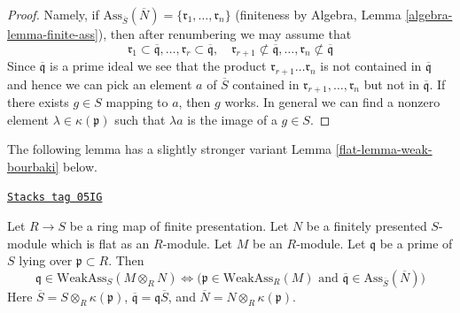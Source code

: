 \begin{proof}
Namely, if $\text{Ass}_{\overline{S}}(\overline{N}) =
\{\mathfrak r_1, \ldots, \mathfrak r_n\}$
(finiteness by Algebra, Lemma \ref{algebra-lemma-finite-ass}),
then after renumbering we may assume that
$$
\mathfrak r_1 \subset \overline{\mathfrak q},
\ldots,
\mathfrak r_r \subset \overline{\mathfrak q}, \quad
\mathfrak r_{r + 1} \not \subset \overline{\mathfrak q},
\ldots,
\mathfrak r_n \not \subset \overline{\mathfrak q}
$$
Since $\overline{\mathfrak q}$ is a prime ideal we see that the product
$\mathfrak r_{r + 1} \ldots \mathfrak r_n$ is not contained in
$\overline{\mathfrak q}$ and hence we can pick an element
$a$ of $\overline{S}$ contained in
$\mathfrak r_{r + 1}, \ldots, \mathfrak r_n$ but not in
$\overline{\mathfrak q}$.
If there exists $g \in S$ mapping to $a$, then $g$
works. In general we can find a nonzero element
$\lambda \in \kappa(\mathfrak p)$
such that $\lambda a$ is the image of a $g \in S$.
\end{proof}

The following lemma has a slightly stronger variant
Lemma \ref{flat-lemma-weak-bourbaki}
below.

\begin{lemma}
\label{flat-lemma-weak-bourbaki-pre}
\href{https://stacks.math.columbia.edu/tag/05IG}{\texttt{Stacks tag 05IG}}

Let $R \to S$ be a ring map of finite presentation.
Let $N$ be a finitely presented $S$-module
which is flat as an $R$-module. Let $M$ be an $R$-module.
Let $\mathfrak q$ be a prime of $S$ lying over $\mathfrak p \subset R$.
Then
$$
\mathfrak q \in \text{WeakAss}_S(M \otimes_R N)
\Leftrightarrow
\Big(
\mathfrak p \in \text{WeakAss}_R(M)
\text{ and }
\overline{\mathfrak q} \in \text{Ass}_{\overline{S}}(\overline{N})
\Big)
$$
Here $\overline{S} = S \otimes_R \kappa(\mathfrak p)$,
$\overline{\mathfrak q} = \mathfrak q \overline{S}$, and
$\overline{N} = N \otimes_R \kappa(\mathfrak p)$.
\end{lemma}


